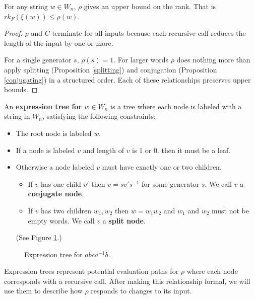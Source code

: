 \documentclass[12pt]{thesis}
\begin{document}
\begin{proposition}
    \label{upper-bounds}
    For any string $w \in W_{n}$, $\rho$ gives an upper bound on the rank. 
    That is $rk_{F}(\xi(w)) \leq \rho(w)$.
\end{proposition}
\begin{proof}
    $\rho$ and $C$ terminate for all inputs because each recursive call reduces the length of the input
    by one or more.

    For a single generator $s$, $\rho(s) = 1$.
    For larger words $\rho$ does nothing more than apply splitting (Proposition \ref{splitting}) and conjugation (Proposition \ref{conjugating}) in a structured order.
    Each of these relationships preserves upper bounds.
\end{proof}

\begin{definition}
    An \textbf{expression tree for $w \in W_{n}$} is a tree where
    each node is labeled with a string in $W_{n}$,
    satisfying the following constraints:
    \begin{itemize}
    \item The root node is labeled $w$.
    \item If a node is labeled $v$ and length of $v$ is 1 or 0.
    then it must be a leaf.
    \item Otherwise a node labeled $v$ must have exactly one
    or two children.
    \begin{itemize}
    \item If $v$ has one child $v'$ then $v = sv's^{-1}$ for some
    generator $s$.
            We call $v$ a \textbf{conjugate node}.
    \item If $v$ has two  children $w_{1}, w_{2}$ then $w = w_{1}w_{2}$
        and $w_{1}$ and $w_{2}$ must not be empty words.
         We call $v$ a \textbf{split node}.
    \end{itemize}
    (See Figure \ref{fig:expression-tree}.)
    \end{itemize}
\end{definition}

\begin{figure}[h]
    \centering
    \def\svgwidth{6cm}
    
    \caption{Expression tree for $abca^{-1}b$.}
    \label{fig:expression-tree}
\end{figure}

Expression trees represent potential evaluation paths
for $\rho$ where each node corresponds
with a recursive call.
After making this relationship formal,
we will use them to describe how $\rho$
responds to changes to its input.
\end{document}
